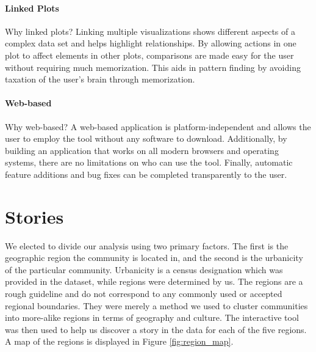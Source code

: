 \documentclass[11pt]{article}\usepackage{knitr}
\begin{document}
\paragraph{Linked Plots}
Why linked plots? Linking multiple visualizations shows different aspects of a complex data set and helps highlight relationships. By allowing actions in one plot to affect elements in other plots, comparisons are made easy for the user without requiring much memorization. This aids in pattern finding by avoiding taxation of the user's brain through memorization.

\paragraph{Web-based}
Why web-based? A web-based application is platform-independent and allows the user to employ the tool without any software to download. Additionally, by building an application that works on all modern browsers and operating systems, there are no limitations on who can use the tool. Finally, automatic feature additions and bug fixes can be completed transparently to the user.


\section{Stories}

We elected to divide our analysis using two primary factors. The first is the geographic region the community is located in, and the second is the urbanicity of the particular community. Urbanicity is a census designation which was provided in the dataset, while regions were determined by us. The regions are a rough guideline and do not correspond to any commonly used or accepted regional boundaries. They were merely a method we used to cluster communities into more-alike regions in terms of geography and culture. The interactive tool was then used to help us discover a story in the data for each of the five regions. A map of the regions is displayed in Figure \ref{fig:region_map}.
\end{document}

